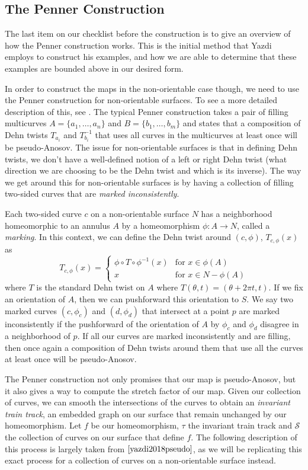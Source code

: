 \subsection{The Penner Construction}

The last item on our checklist before the construction is to give an overview of how the Penner construction works. This is the initial method that Yazdi employs to construct his examples, and how we are able to determine that these examples are bounded above in our desired form. 

In order to construct the maps in the non-orientable case though, we need to use the Penner construction for non-orientable surfaces. To see a more detailed description of this, see \cite{Strenner_2017}. The typical Penner construction takes a pair of filling multicurves $A = \{a_1,\dots,a_n\}$ and $B = \{b_1,\dots,b_m\}$ and states that a composition of Dehn twists $T_{a_i}$ and $T_{b_i}^{-1}$ that uses all curves in the multicurves at least once will be pseudo-Anosov. The issue for non-orientable surfaces is that in defining Dehn twists, we don't have a well-defined notion of a left or right Dehn twist (what direction we are choosing to be the Dehn twist and which is its inverse). The way we get around this for non-orientable surfaces is by having a collection of filling two-sided curves that are \textit{marked inconsistently}. 

Each two-sided curve $c$ on a non-orientable surface $N$ has a neighborhood homeomorphic to an annulus $A$ by a homeomorphism $\phi: A \xrightarrow{} N$, called a \textit{marking}. In this context, we can define the Dehn twist around $(c,\phi)$, $T_{c,\phi}(x)$ as $$T_{c,\phi}(x) = \begin{cases} \phi \circ T \circ \phi^{-1}(x) & \text{for } x \in \phi(A) \\ x & \text{for } x \in N - \phi(A) \end{cases}$$ where $T$ is the standard Dehn twist on $A$ where $T(\theta,t) = (\theta + 2\pi t,t)$. If we fix an orientation of $A$, then we can pushforward this orientation to $S$. We say two marked curves $(c,\phi_c)$ and $(d,\phi_d)$ that intersect at a point $p$ are marked inconsistently if the pushforward of the orientation of $A$ by $\phi_c$ and $\phi_d$ disagree in a neighborhood of $p$.  If all our curves are marked inconsistently and are filling, then once again a composition of Dehn twists around them that use all the curves at least once will be pseudo-Anosov. 

The Penner construction \cite{penner1988construction} not only promises that our map is pseudo-Anosov, but it also gives a way to compute the stretch factor of our map. Given our collection of curves, we can smooth the intersections of the curves to obtain an \textit{invariant train track}, an embedded graph on our surface that remain unchanged by our homeomorphism. Let $f$ be our homeomorphism, $\tau$ the invariant train track and $\mathcal{S}$ the collection of curves on our surface that define $f$. The following description of this process is largely taken from $\cite{yazdi2018pseudo}$, as we will be replicating this exact process for a collection of curves on a non-orientable surface instead.

